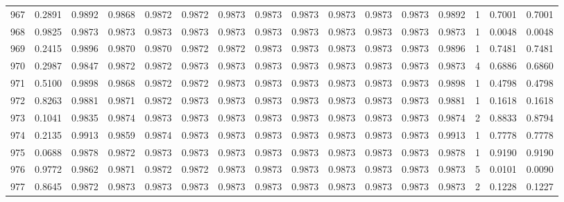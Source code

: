 \begin{tabular}{lrrrrrrrrrrrrrrr}
967 &      0.2891 &  0.9892 &  0.9868 &  0.9872 &  0.9872 &  0.9873 &  0.9873 &  0.9873 &  0.9873 &  0.9873 &   0.9873 &     0.9892 &      1 &                    0.7001 &                     0.7001 \\
968 &      0.9825 &  0.9873 &  0.9873 &  0.9873 &  0.9873 &  0.9873 &  0.9873 &  0.9873 &  0.9873 &  0.9873 &   0.9873 &     0.9873 &      1 &                    0.0048 &                     0.0048 \\
969 &      0.2415 &  0.9896 &  0.9870 &  0.9870 &  0.9872 &  0.9872 &  0.9873 &  0.9873 &  0.9873 &  0.9873 &   0.9873 &     0.9896 &      1 &                    0.7481 &                     0.7481 \\
970 &      0.2987 &  0.9847 &  0.9872 &  0.9872 &  0.9873 &  0.9873 &  0.9873 &  0.9873 &  0.9873 &  0.9873 &   0.9873 &     0.9873 &      4 &                    0.6886 &                     0.6860 \\
971 &      0.5100 &  0.9898 &  0.9868 &  0.9872 &  0.9872 &  0.9873 &  0.9873 &  0.9873 &  0.9873 &  0.9873 &   0.9873 &     0.9898 &      1 &                    0.4798 &                     0.4798 \\
972 &      0.8263 &  0.9881 &  0.9871 &  0.9872 &  0.9873 &  0.9873 &  0.9873 &  0.9873 &  0.9873 &  0.9873 &   0.9873 &     0.9881 &      1 &                    0.1618 &                     0.1618 \\
973 &      0.1041 &  0.9835 &  0.9874 &  0.9873 &  0.9873 &  0.9873 &  0.9873 &  0.9873 &  0.9873 &  0.9873 &   0.9873 &     0.9874 &      2 &                    0.8833 &                     0.8794 \\
974 &      0.2135 &  0.9913 &  0.9859 &  0.9874 &  0.9873 &  0.9873 &  0.9873 &  0.9873 &  0.9873 &  0.9873 &   0.9873 &     0.9913 &      1 &                    0.7778 &                     0.7778 \\
975 &      0.0688 &  0.9878 &  0.9872 &  0.9873 &  0.9873 &  0.9873 &  0.9873 &  0.9873 &  0.9873 &  0.9873 &   0.9873 &     0.9878 &      1 &                    0.9190 &                     0.9190 \\
976 &      0.9772 &  0.9862 &  0.9871 &  0.9872 &  0.9872 &  0.9873 &  0.9873 &  0.9873 &  0.9873 &  0.9873 &   0.9873 &     0.9873 &      5 &                    0.0101 &                     0.0090 \\
977 &      0.8645 &  0.9872 &  0.9873 &  0.9873 &  0.9873 &  0.9873 &  0.9873 &  0.9873 &  0.9873 &  0.9873 &   0.9873 &     0.9873 &      2 &                    0.1228 &                     0.1227 \\

\end{tabular}

